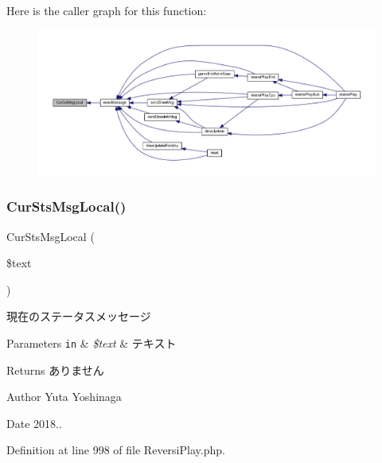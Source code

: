 Here is the caller graph for this function\+:\nopagebreak
\begin{figure}[H]
\begin{center}
\leavevmode
\includegraphics[width=350pt]{class_reversi_play_aa217a221907e90c97719f8332c60a6d6_icgraph}
\end{center}
\end{figure}
\mbox{\label{class_reversi_play_ae3da8fb1a3a365c6e5254e5cf6f1e7bc}} 
\subsubsection{\texorpdfstring{Cur\+Sts\+Msg\+Local()}{CurStsMsgLocal()}}
{\footnotesize\ttfamily Cur\+Sts\+Msg\+Local (\begin{DoxyParamCaption}\item[{}]{\$text }\end{DoxyParamCaption})\hspace{0.3cm}{\ttfamily [private]}}



現在のステータスメッセージ 


\begin{DoxyParams}[1]{Parameters}
\mbox{\tt in}  & {\em \$text} & テキスト \\
\hline
\end{DoxyParams}
\begin{DoxyReturn}{Returns}
ありません 
\end{DoxyReturn}
\begin{DoxyAuthor}{Author}
Yuta Yoshinaga 
\end{DoxyAuthor}
\begin{DoxyDate}{Date}
2018.. 
\end{DoxyDate}


Definition at line 998 of file Reversi\+Play.\+php.



